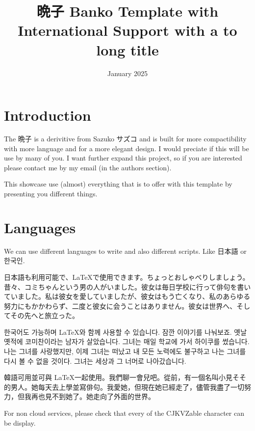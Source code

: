 \documentclass{banko}
\title{晩子 Banko Template with International Support with a to long title}
\date{January 2025}
\begin{document}
\maketitle

\romanPage

\tableofcontents

\lipsum[1-8]

\clearpage
\arabicPage

\newpage

\section{Introduction}

The 晩子 is a derivitive from Sazuko サズコ and is built for more compactibility with more language and for a more elegant design. I would preciate if this will be use by many of you. I want further expand this project, so if you are interested please contact me by my email (in the authors section).

This showcase use (almost) everything that is to offer with this template by presenting you different things.

\section{Languages}

We can use different languages to write and also different scripts. Like 日本語 or 한국인.

日本語も利用可能で、\LaTeX で使用できます。ちょっとおしゃべりしましょう。昔々、コミちゃんという男の人がいました。彼女は毎日学校に行って俳句を書いていました。私は彼女を愛していましたが、彼女はもう亡くなり、私のあらゆる努力にもかかわらず、二度と彼女に会うことはありません。彼女は世界へ、そしてその先へと旅立った。

한국어도 가능하며 \LaTeX 와 함께 사용할 수 있습니다. 잠깐 이야기를 나눠보죠. 옛날 옛적에 코미찬이라는 남자가 살았습니다. 그녀는 매일 학교에 가서 하이쿠를 썼습니다. 나는 그녀를 사랑했지만, 이제 그녀는 떠났고 내 모든 노력에도 불구하고 나는 그녀를 다시 볼 수 없을 것이다. 그녀는 세상과 그 너머로 나아갔습니다.

韓語可用並可與 \LaTeX 一起使用。我們聊一會兒吧。從前，有一個名叫小見そそ的男人。她每天去上學並寫俳句。我愛她，但現在她已經走了，儘管我盡了一切努力，但我再也見不到她了。她走向了外面的世界。

For non cloud services, please check that every of the CJKVZable character can be display.
\end{document}
